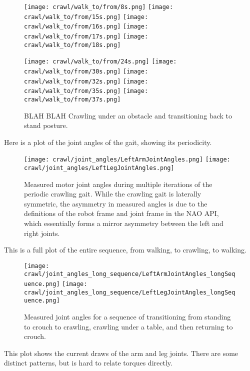 \begin{figure}
  \centerline{
    \texttt{[image: crawl/walk\_to/from/8s.png]}
    \texttt{[image: crawl/walk\_to/from/15s.png]}
    \texttt{[image: crawl/walk\_to/from/16s.png]}
    \texttt{[image: crawl/walk\_to/from/17s.png]}
    \texttt{[image: crawl/walk\_to/from/18s.png]}
  }
  \centerline{
    \texttt{[image: crawl/walk\_to/from/24s.png]}
    \texttt{[image: crawl/walk\_to/from/30s.png]}
    \texttt{[image: crawl/walk\_to/from/32s.png]}
    \texttt{[image: crawl/walk\_to/from/35s.png]}
    \texttt{[image: crawl/walk\_to/from/37s.png]}
  }
  \caption{BLAH BLAH Crawling under an obstacle and transitioning back to stand posture.}
  \label{fig:nao_crawl4}
\end{figure}

Here is a plot of the joint angles of the gait, showing its periodicity.

\begin{figure}
  \centerline{
    \texttt{[image: crawl/joint\_angles/LeftArmJointAngles.png]}
    \texttt{[image: crawl/joint\_angles/LeftLegJointAngles.png]}
  }
  \caption{Measured motor joint angles during multiple iterations of the periodic crawling gait.
           While the crawling gait is laterally symmetric, the asymmetry in measured angles is due to the
           definitions of the robot frame and joint frame in the NAO API, which essentially forms a mirror
           asymmetry between the left and right joints.}
  \label{fig:nao_joint_angles1}
\end{figure}

This is a full plot of the entire sequence, from walking, to crawling, to walking.

\begin{figure}
  \centerline{
    \texttt{[image: crawl/joint\_angles\_long\_sequence/LeftArmJointAngles\_longSequence.png]}
    \texttt{[image: crawl/joint\_angles\_long\_sequence/LeftLegJointAngles\_longSequence.png]}
  }
  \caption{Measured joint angles for a sequence of transitioning from standing to crouch to crawling,
           crawling under a table, and then returning to crouch.}
  \label{fig:nao_joint_angles_long_seq}
\end{figure}

This plot shows the current draws of the arm and leg joints.
There are some distinct patterns, but is hard to relate torques directly.


